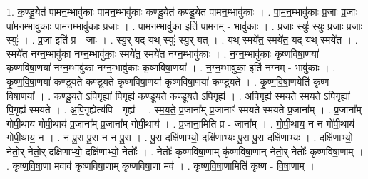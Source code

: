 \documentclass[17pt]{extarticle}
\begin{document}
1. क॒ण्डू॒येत॑ पामन॒म्भावु॑काः पामन॒म्भावु॑काः कण्डू॒येत॑ कण्डू॒येत॑ पामन॒म्भावु॑काः । . पा॒म॒न॒म्भावु॑काः प्र॒जाः प्र॒जाः पा॑मन॒म्भावु॑काः पामन॒म्भावु॑काः प्र॒जाः । . पा॒म॒न॒म्भावु॑का॒ इति॑ पामनम् - भावु॑काः । . प्र॒जाः स्युः॑ स्युः प्र॒जाः प्र॒जाः स्युः॑ । . प्र॒जा इति॑ प्र - जाः । . स्यु॒र् यद् यथ् स्युः॑ स्यु॒र् यत् । . यथ् स्मये॑त॒ स्मये॑त॒ यद् यथ् स्मये॑त । . स्मये॑त नग्न॒म्भावु॑का नग्न॒म्भावु॑काः॒ स्मये॑त॒ स्मये॑त नग्न॒म्भावु॑काः । . न॒ग्न॒म्भावु॑काः कृष्णविषा॒णया॑ कृष्णविषा॒णया॑ नग्न॒म्भावु॑का नग्न॒म्भावु॑काः कृष्णविषा॒णया᳚ । . न॒ग्न॒म्भावु॑का॒ इति॑ नग्नम् - भावु॑काः । . कृ॒ष्ण॒वि॒षा॒णया॑ कण्डूयते कण्डूयते कृष्णविषा॒णया॑ कृष्णविषा॒णया॑ कण्डूयते । . कृ॒ष्ण॒वि॒षा॒णयेति॑ कृष्ण - वि॒षा॒णया᳚ । . क॒ण्डू॒य॒ते॒ ऽपि॒गृह्या॑ पि॒गृह्य॑ कण्डूयते कण्डूयते ऽपि॒गृह्य॑ । . अ॒पि॒गृह्य॑ स्मयते स्मयते ऽपि॒गृह्या॑ पि॒गृह्य॑ स्मयते । . अ॒पि॒गृह्येत्य॑पि - गृह्य॑ । . स्म॒य॒ते॒ प्र॒जाना᳚म् प्र॒जानाꣳ॑ स्मयते स्मयते प्र॒जाना᳚म् । . प्र॒जाना᳚म् गोपी॒थाय॑ गोपी॒थाय॑ प्र॒जाना᳚म् प्र॒जाना᳚म् गोपी॒थाय॑ । . प्र॒जाना॒मिति॑ प्र - जाना᳚म् । . गो॒पी॒थाय॒ न न गो॑पी॒थाय॑ गोपी॒थाय॒ न । . न पु॒रा पु॒रा न न पु॒रा । . पु॒रा दक्षि॑णाभ्यो॒ दक्षि॑णाभ्यः पु॒रा पु॒रा दक्षि॑णाभ्यः । . दक्षि॑णाभ्यो॒ नेतो॒र् नेतो॒र् दक्षि॑णाभ्यो॒ दक्षि॑णाभ्यो॒ नेतोः᳚ । . नेतोः᳚ कृष्णविषा॒णाम् कृ॑ष्णविषा॒णान् नेतो॒र् नेतोः᳚ कृष्णविषा॒णाम् । . कृ॒ष्ण॒वि॒षा॒णा मवाव॑ कृष्णविषा॒णाम् कृ॑ष्णविषा॒णा मव॑ । . कृ॒ष्ण॒वि॒षा॒णामिति॑ कृष्ण - वि॒षा॒णाम् । \newline
\end{document}
